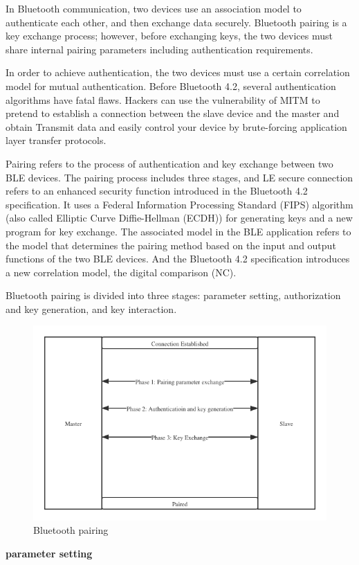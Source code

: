 \documentclass[11pt,en]{elegantpaper}
\begin{document}
In Bluetooth communication, two devices use an association model to authenticate each other, and then exchange data securely. Bluetooth pairing is a key exchange process; however, before exchanging keys, the two devices must share internal pairing parameters including authentication requirements.

In order to achieve authentication, the two devices must use a certain correlation model for mutual authentication. Before Bluetooth 4.2, several authentication algorithms have fatal flaws. Hackers can use the vulnerability of MITM to pretend to establish a connection between the slave device and the master and obtain Transmit data and easily control your device by brute-forcing application layer transfer protocols.

Pairing refers to the process of authentication and key exchange between two BLE devices. The pairing process includes three stages, and LE secure connection refers to an enhanced security function introduced in the Bluetooth 4.2 specification. It uses a Federal Information Processing Standard (FIPS) algorithm (also called Elliptic Curve Diffie-Hellman (ECDH)) for generating keys and a new program for key exchange. The associated model in the BLE application refers to the model that determines the pairing method based on the input and output functions of the two BLE devices. And the Bluetooth 4.2 specification introduces a new correlation model, the digital comparison (NC).

Bluetooth pairing is divided into three stages: parameter setting, authorization and key generation, and key interaction.

\begin{figure}[h]
	\centering
	\includegraphics[width=0.7\linewidth]{figure/auble}
	\caption{Bluetooth pairing}
	\label{fig:fig1}
\end{figure}

\textbf{parameter setting}
\end{document}
